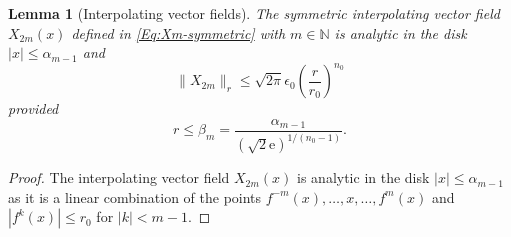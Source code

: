 \documentclass[a4paper,12pt]{article}
\newtheorem{lemma}[thm]{Lemma}
\begin{document}
\begin{lemma}[Interpolating vector fields]
The  symmetric interpolating vector field $X_{2m}(x)$
defined in \eqref{Eq:Xm-symmetric} with  $m\in\mathbb N$ 
is analytic in the disk $|x|\le \alpha_{m-1}$
and 
\begin{equation}\label{Eq:Xm-bound}
    \|X_{2m}\|_{r}\le \sqrt{2\pi}\epsilon_0\left(\frac{r}{r_0}\right)^{n_0}
\end{equation}
provided
\begin{equation}\label{Eq:beta_m}
r\le  \beta_m=\frac{\alpha_{m-1}}{(\sqrt 2\mathrm e)^{1/(n_0-1)}}.    
\end{equation}

\end{lemma}
\begin{proof} 
The interpolating vector field $X_{2m}(x)$
is analytic in the disk $|x|\le \alpha_{m-1}$ as it 
is a linear combination of the points
\(f^{-m}(x),\ldots,x,\dots,f^m(x)\)
and $|f^k(x)|\le r_0$ for $|k|< m-1$.


\end{proof}
\end{document}

